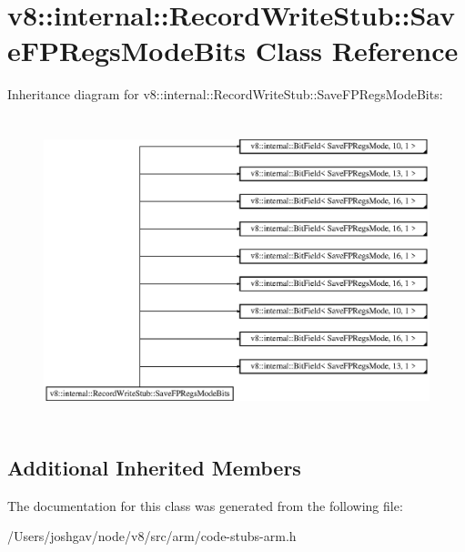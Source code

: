 \hypertarget{classv8_1_1internal_1_1_record_write_stub_1_1_save_f_p_regs_mode_bits}{}\section{v8\+:\+:internal\+:\+:Record\+Write\+Stub\+:\+:Save\+F\+P\+Regs\+Mode\+Bits Class Reference}
\label{classv8_1_1internal_1_1_record_write_stub_1_1_save_f_p_regs_mode_bits}
Inheritance diagram for v8\+:\+:internal\+:\+:Record\+Write\+Stub\+:\+:Save\+F\+P\+Regs\+Mode\+Bits\+:\begin{figure}[H]
\begin{center}
\leavevmode
\includegraphics[height=8.917197cm]{classv8_1_1internal_1_1_record_write_stub_1_1_save_f_p_regs_mode_bits}
\end{center}
\end{figure}
\subsection*{Additional Inherited Members}


The documentation for this class was generated from the following file\+:\begin{DoxyCompactItemize}
\item 
/\+Users/joshgav/node/v8/src/arm/code-\/stubs-\/arm.\+h\end{DoxyCompactItemize}
